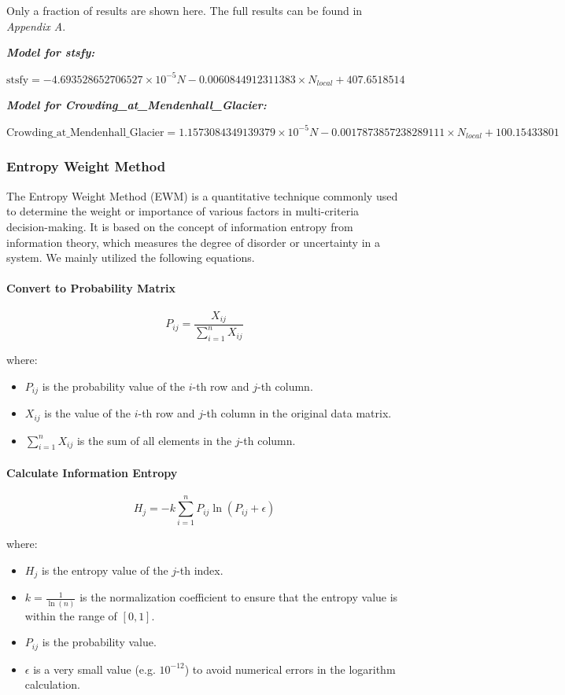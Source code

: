 Only a fraction of results are shown here. The full results can be found in \textit{Appendix A}.

\textbf{\textit{Model for stsfy: }}

$\text{stsfy} = -4.693528652706527\times 10^{-5} N - 0.0060844912311383 \times N_{local} + 407.6518514$

\textbf{\textit{Model for Crowding\_at\_Mendenhall\_Glacier: }}

$\text{Crowding\_at\_Mendenhall\_Glacier} = 1.1573084349139379\times 10^{-5} N - 0.0017873857238289111 \times N_{local} + 100.15433801$


\subsubsection{Entropy Weight Method}

The Entropy Weight Method (EWM) is a quantitative technique commonly used 
to determine the weight or importance of various factors in multi-criteria 
decision-making. It is based on the concept of information entropy from 
information theory, which measures the degree of disorder or uncertainty in a system.
We mainly utilized the following equations.

\paragraph{Convert to Probability Matrix}


\[P_{i j}=\frac{X_{i j}}{\sum_{i=1}^n X_{i j}}\]


where:
\begin{itemize}
    \item $P_{i j}$ is the probability value of the $i$-th row and $j$-th column.
    \item $X_{i j}$ is the value of the $i$-th row and $j$-th column in the original data matrix.
    \item $\sum_{i=1}^n X_{i j}$ is the sum of all elements in the $j$-th column.
\end{itemize}

\paragraph{Calculate Information Entropy}


\[H_j=-k \sum_{i=1}^n P_{i j} \ln \left(P_{i j}+\epsilon\right)\]

where:

\begin{itemize}
    \item $H_j$ is the entropy value of the $j$-th index.
    \item $k=\frac{1}{\ln (n)}$ is the normalization coefficient to ensure that the entropy value is within the range of $[0,1]$.
    \item $P_{i j}$ is the probability value.
    \item $\epsilon$ is a very small value (e.g. $10^{-12}$) to avoid numerical errors in the logarithm calculation.
\end{itemize}

